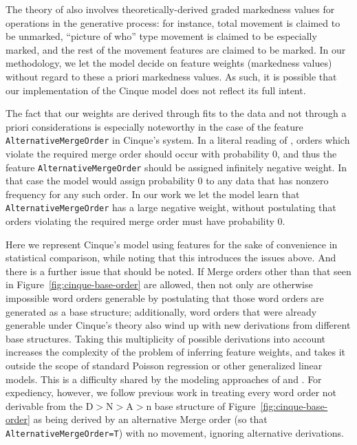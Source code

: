 \documentclass[11pt]{article}
\newcommand{\alternativeMergeOrder}{\texttt{AlternativeMergeOrder}\xspace}
\begin{document}
The theory of \citet{cinque2005deriving} also involves theoretically-derived graded markedness values for operations in the generative process: for instance, total movement is claimed to be unmarked, ``picture of who'' type movement is claimed to be especially marked, and the rest of the movement features are claimed to be marked.
In our methodology, we let the model decide on feature weights (markedness values) without regard to these a priori markedness values.
As such, it is possible that our implementation of the Cinque model
does not reflect its full intent. 

The fact that our weights are derived through fits to the data and not through a priori considerations is especially noteworthy in the case of the feature \alternativeMergeOrder in Cinque's system.
In a literal reading of \citet{cinque2005deriving}, orders which violate the required merge order should occur with probability 0, and thus the feature \alternativeMergeOrder should be assigned infinitely negative weight.
In that case the model would assign probability 0 to any data that has nonzero frequency for any such order.
In our work we let the model learn that \alternativeMergeOrder has a large negative weight, without postulating that orders violating the required merge order must have probability 0.

Here we represent Cinque's model using features for the sake of
convenience in statistical comparison, while noting that this
introduces the issues above.  And there is a further issue that should
be noted.  If Merge orders other than that seen in
Figure~\ref{fig:cinque-base-order} are allowed, then not only are
otherwise impossible word orders generable by postulating that those
word orders are generated as a base structure; additionally, word
orders that were already generable under Cinque's theory also wind up
with new derivations from different base structures.  Taking this
multiplicity of possible derivations into account increases the
complexity of the problem of inferring feature weights, and takes it
outside the scope of standard Poisson regression or other generalized
linear models.  This is a difficulty shared by the modeling approaches
of \citet{cysouw2010dealing} and \citet{merlo2015predicting}.  For
expediency, however, we follow previous work in treating every word
order not derivable from the D$>$N$>$A$>$n base structure of
Figure~\ref{fig:cinque-base-order} as being derived by an alternative
Merge order (so that \alternativeMergeOrder\texttt{=T}) with no
movement, ignoring alternative derivations.
\end{document}
